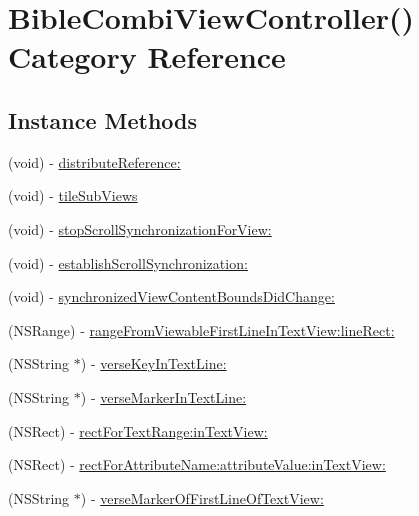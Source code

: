\hypertarget{category_bible_combi_view_controller_07_08}{\section{Bible\-Combi\-View\-Controller() Category Reference}
\label{category_bible_combi_view_controller_07_08}
}
\subsection*{Instance Methods}
\begin{DoxyCompactItemize}
\item 
(void) -\/ \hyperlink{category_bible_combi_view_controller_07_08_a1c3d83c90c5ee9b683ab8016c8d96ffa}{distribute\-Reference\-:}
\item 
(void) -\/ \hyperlink{category_bible_combi_view_controller_07_08_a8026ab78b56aa07f9c4cd6e845c87002}{tile\-Sub\-Views}
\item 
(void) -\/ \hyperlink{category_bible_combi_view_controller_07_08_ab88428fa2dace26bc0bdc4e4a8353833}{stop\-Scroll\-Synchronization\-For\-View\-:}
\item 
(void) -\/ \hyperlink{category_bible_combi_view_controller_07_08_a526944a0c6b1a6d0d1ff8614c3b9b6dc}{establish\-Scroll\-Synchronization\-:}
\item 
(void) -\/ \hyperlink{category_bible_combi_view_controller_07_08_a8386474a0c75df1b95e98761fdc6312c}{synchronized\-View\-Content\-Bounds\-Did\-Change\-:}
\item 
(N\-S\-Range) -\/ \hyperlink{category_bible_combi_view_controller_07_08_a31fb36e3c3ef24a069b34db95b88119c}{range\-From\-Viewable\-First\-Line\-In\-Text\-View\-:line\-Rect\-:}
\item 
(N\-S\-String $\ast$) -\/ \hyperlink{category_bible_combi_view_controller_07_08_a01dc63496db2f96132a7c140adb65d0f}{verse\-Key\-In\-Text\-Line\-:}
\item 
(N\-S\-String $\ast$) -\/ \hyperlink{category_bible_combi_view_controller_07_08_a8c42b8f0058d1d6123d417fe0ddf94ba}{verse\-Marker\-In\-Text\-Line\-:}
\item 
(N\-S\-Rect) -\/ \hyperlink{category_bible_combi_view_controller_07_08_a7aea27d9dc1f2e1c6d217957310bf668}{rect\-For\-Text\-Range\-:in\-Text\-View\-:}
\item 
(N\-S\-Rect) -\/ \hyperlink{category_bible_combi_view_controller_07_08_a46aba8810c50c41a5203889db1964fec}{rect\-For\-Attribute\-Name\-:attribute\-Value\-:in\-Text\-View\-:}
\item 
(N\-S\-String $\ast$) -\/ \hyperlink{category_bible_combi_view_controller_07_08_a4b5d16c86ac3c4766bb71219bf3cf5f8}{verse\-Marker\-Of\-First\-Line\-Of\-Text\-View\-:}
\end{DoxyCompactItemize}
